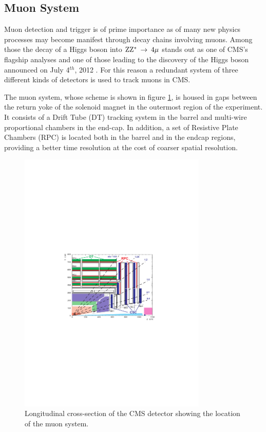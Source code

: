 \subsection{Muon System}

Muon detection and trigger is of prime importance as of many new physics processes may become manifest through decay chains involving muons. Among those the decay of a Higgs boson into $\mathrm{Z}\mathrm{Z}^*\:\rightarrow\:4\mu$ stands out as one of CMS's flagship analyses and one of those leading to the discovery of the Higgs boson announced on July 4$^{th}$, 2012 \cite{Chatrchyan:2013lba}. For this reason a redundant system of three different kinds of detectors is used to track muons in CMS. 

The muon system, whose scheme is shown in figure \ref{fig:mudet}, is housed in gaps between the return yoke of the solenoid magnet in the outermost region of the experiment. It consists of a Drift Tube (DT) tracking system in the barrel and multi-wire proportional chambers in the end-cap. In addition, a set of Resistive Plate Chambers (RPC) is located both in the barrel and in the endcap regions, providing a better time resolution  at the cost of coarser spatial resolution. 

\begin{figure}
\begin{center}
\includegraphics[angle=-0,width=0.8\textwidth]{2_LHC_and_CMS/pics/mudet.pdf}
\caption{Longitudinal cross-section of the CMS detector showing the location of the muon system.
\label{fig:mudet}
}
\end{center}
\end{figure}

